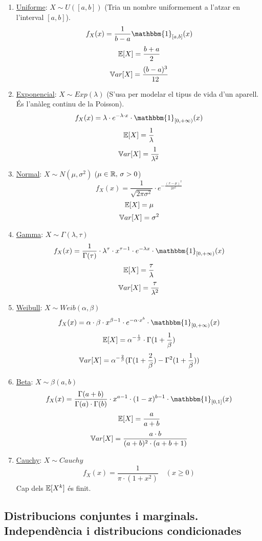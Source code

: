 \begin{enumerate}
    \item \underline{Uniforme}: $X \sim U([a,b])$ \quad (Tria un nombre uniformement a l'atzar en l'interval $[a,b]$). \\
    \[
      f_{X}(x)=\frac{1}{b-a}\mathbbm{1}_{[a,b]}(x)
    \]
    \[
      \mathbb{E}[X]=\frac{b+a}{2}
    \]
    \[
      \mathbb{V} ar[X]=\frac{(b-a)^{3}}{12}
    \]
    \item \underline{Exponencial}: $X\sim Exp(\lambda)$ \quad (S'usa per modelar el tipus de vida d'un aparell. És l'anàleg continu de la Poisson).
    \[
      f_{X}(x)=\lambda\cdot e^{-\lambda\cdot x}\cdot \mathbbm{1}_{[0,+\infty)}(x)
    \]
    \[
      \mathbb{E}[X]=\frac{1}{\lambda}
    \]
    \[
      \mathbb{V} ar[X]=\frac{1}{\lambda^{2}}
    \]
    \item \underline{Normal}: $X\sim N(\mu, \sigma^{2})$ \quad ($\mu \in \mathbb{R}, \, \sigma > 0$)
    \[
      f_{X}(x)=\frac{1}{\sqrt{2\pi\sigma^{2}}}\cdot e^{-\frac{(x-\mu)^{2}}{2\sigma^{2}}}
    \]
    \[
      \mathbb{E}[X]=\mu
    \]
    \[
      \mathbb{V} ar[X]=\sigma^{2}
    \]
    \item \underline{Gamma}: $X \sim \Gamma(\lambda, \tau)$
    \[
      f_{X}(x)=\frac{1}{\Gamma(\tau)}\cdot \lambda^{\tau}\cdot x^{\tau -1}\cdot e^{-\lambda x}\cdot \mathbbm{1}_{[0,+\infty)}(x)
    \]
    \[
      \mathbb{E}[X]=\frac{\tau}{\lambda}
    \]
    \[
      \mathbb{V} ar[X]=\frac{\tau}{\lambda^{2}}
    \]
    \item \underline{Weibull}: $X\sim Weib(\alpha, \beta)$
    \[
      f_{X}(x)=\alpha\cdot \beta \cdot x^{\beta-1}\cdot e^{-\alpha\cdot x^{b}}\cdot \mathbbm{1}_{[0,+\infty)}(x)
    \]
    \[
      \mathbb{E}[X]=\alpha^{-\frac{1}{\beta}}\cdot \Gamma(1+\frac{1}{\beta})
    \]
    \[
      \mathbb{V} ar[X]=\alpha^{-\frac{2}{\beta}}(\Gamma(1+\frac{2}{\beta})-\Gamma^{2}(1+\frac{1}{\beta}))
    \]
    \item \underline{Beta}: $X\sim \beta(a,b)$
    \[
      f_{X}(x)=\frac{\Gamma(a+b)}{\Gamma(a)\cdot \Gamma(b)}\cdot x^{a-1}\cdot (1-x)^{b-1}\cdot \mathbbm{1}_{[0,1]}(x)
    \]
    \[
      \mathbb{E}[X]=\frac{a}{a+b}
    \]
    \[
      \mathbb{V} ar[X]=\frac{a\cdot b}{(a+b)^{2}\cdot (a+b+1)}
    \]
    \item \underline{Cauchy}: $X\sim Cauchy$
    \[
      f_{X}(x)=\frac{1}{\pi\cdot (1+x^{2})} \quad (x \geq 0)
    \]
     \quad Cap dels $\mathbb{E}[X^{k}]$ és finit.
\end{enumerate}

\subsection{Distribucions conjuntes i marginals. Independència i distribucions condicionades}

